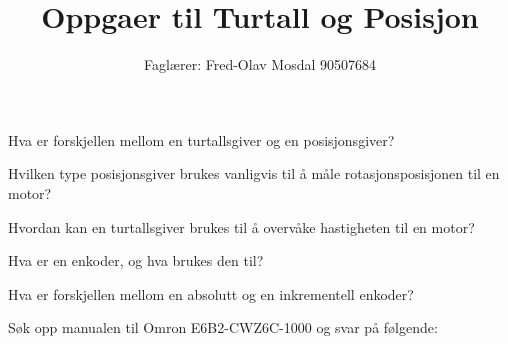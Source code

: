 \documentclass[12pt,a4paper]{article}
\def\oppgave{
		}
\begin{document}
\title{Oppgaer til Turtall og Posisjon}
\author{Faglærer: Fred-Olav Mosdal 90507684\\}
\maketitle
\oppgave{}%
\vskip 2.5pt 
Hva er forskjellen mellom en turtallsgiver og en posisjonsgiver?
\vskip 5pt 
\vskip 2.5pt 
\oppgave{}%
\vskip 2.5pt 
Hvilken type posisjonsgiver brukes vanligvis til å måle rotasjonsposisjonen til en motor?
\vskip 5pt 
\vskip 2.5pt 
\oppgave{}%
\vskip 2.5pt 
Hvordan kan en turtallsgiver brukes til å overvåke hastigheten til en motor?
\vskip 5pt 
\vskip 2.5pt 
\oppgave{}%
\vskip 2.5pt 
Hva er en enkoder, og hva brukes den til?
\vskip 5pt 
\vskip 2.5pt 
\oppgave{}%
\vskip 2.5pt 
Hva er forskjellen mellom en absolutt og en inkrementell enkoder?


\vskip 5pt 
\vskip 2.5pt 
\oppgave{}%
\vskip 2.5pt 
Søk opp manualen til Omron E6B2-CWZ6C-1000 og svar på følgende:
\end{document}
